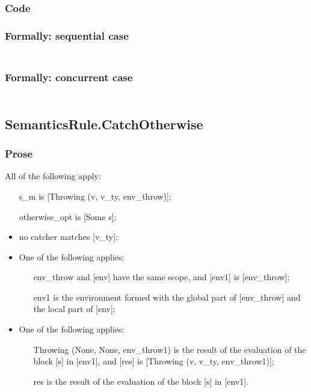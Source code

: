 \documentclass{book}
\begin{document}
  \subsubsection{Code}

  \subsubsection{Formally: sequential case}
  \begin{align}
  \end{align} 

  \subsubsection{Formally: concurrent case}
  \begin{align}
  \end{align} 

\subsection{SemanticsRule.CatchOtherwise \label{sec:SemanticsRule.CatchOtherwise}}

    \subsubsection{Prose}
    All of the following apply:
    \begin{itemize}
    \item [s\_m] is [Throwing (v, v\_ty, env\_throw)];
    \item [otherwise\_opt] is [Some s];
    \item no catcher matches [v\_ty];
    \item One of the following applies:
      \begin{itemize}
      \item [env\_throw] and [env] have the same scope, and [env1] is [env\_throw];
      \item [env1] is the environment formed with the global part of [env\_throw]
        and the local part of [env];
      \end{itemize}
    \item One of the following applies:
      \begin{itemize}
      \item [Throwing (None, None, env\_throw1)] is the result of the evaluation of
        the block [s] in [env1], and [res] is [Throwing (v, v\_ty, env\_throw1)];
      \item [res] is the result of the evaluation of the block [s] in [env1].
      \end{itemize}
    \end{itemize}
\end{document}
